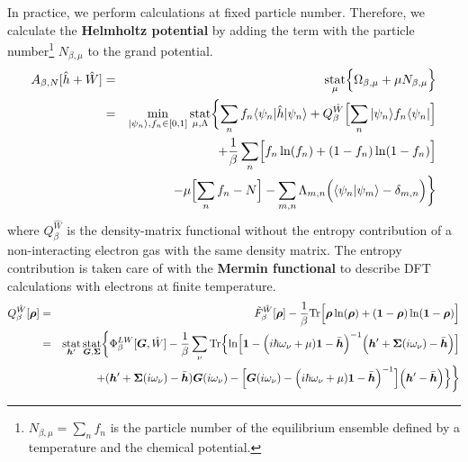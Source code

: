 \documentclass[11pt,a4paper]{report}
\begin{document}
In practice, we perform calculations at fixed particle
number. Therefore, we calculate the \textbf{Helmholtz
  potential} by adding the term with the
particle number\footnote{$N_{\beta,\mu}=\sum_n f_n$ is the particle
  number of the equilibrium ensemble defined by a temperature and the
  chemical potential.} $N_{\beta,\mu}$ to the grand potential.
\begin{eqnarray}
A_{\beta,N}[\hat{h}+\hat{W}]
&=&\operatorname*{stat}_\mu\Bigl\lbrace\Omega_{\beta,\mu}+\mu N_{\beta,\mu}\Bigr\rbrace
\nonumber\\
&=&\min_{|\psi_n\rangle,f_n\in[0,1]}\operatorname*{stat}_{\mu,\Lambda}
\biggl\lbrace\sum_n f_n\langle\psi_n|\hat{h}|\psi_n\rangle
+Q_\beta^{\hat{W}}\Bigl[\sum_n|\psi_n\rangle f_n\langle\psi_n|\Bigr]
\nonumber\\
&&+\frac{1}{\beta}\sum_n\Bigl[f_n\ln(f_n)+(1-f_n)\ln(1-f_n)\Bigr]
\nonumber\\
&&
-\mu\Bigl[\sum_n f_n-N\Bigr]
-\sum_{m,n}\Lambda_{m,n}\Bigl(\langle\psi_n|\psi_m\rangle-\delta_{m,n}\Bigr)
\biggr\rbrace
\label{eq:hp}
\end{eqnarray}
where $Q^{\hat{W}}_\beta$ is the density-matrix functional without the
entropy contribution of a non-interacting electron gas with the same
density matrix.  The entropy contribution is taken care of with the
\textbf{Mermin functional}\cite{mermin65_pr137_a1441} to describe DFT calculations
with electrons at finite temperature.
\begin{eqnarray}
Q^{\hat{W}}_\beta[\bm{\rho}]
&=&\tilde{F}^{\hat{W}}_\beta[\bm{\rho}]
-
\frac{1}{\beta}\mathrm{Tr}\Bigl[
\bm{\rho}\ln(\bm{\rho})+(\bm{1}-\bm{\rho})\ln(\bm{1}-\bm{\rho})\Bigr]
\nonumber\\
&=&
\operatorname*{stat}_{\bm{h}'}\operatorname*{stat}_{\bm{G},\bm{\Sigma}}
\biggl\lbrace
\Phi^{LW}_\beta[\bm{G},\hat{W}]
-\frac{1}{\beta}\sum_\nu\mathrm{Tr}\Bigl\lbrace
\ln\Bigl[
\bm{1}-
\Bigl(i\hbar\omega_\nu+\mu)\bm{1}-\bar{\bm{h}}\Bigr)^{-1}
\Bigl(\bm{h}'+\bm{\Sigma}(i\omega_\nu)-\bar{\bm{h}}\Bigr)
\Bigr]
\nonumber\\&&
+(\bm{h}'+\bm{\Sigma}(i\omega_\nu)-\bar{\bm{h}})\bm{G}(i\omega_\nu)
-
\Bigl[
\bm{G}(i\omega_\nu)
-\Bigl(i\hbar\omega_\nu+\mu)\bm{1}-\bar{\bm{h}}\Bigr)^{-1}
\Bigr]
\Bigl(\bm{h}'-\bar{\bm{h}}\Bigr)\Bigr\rbrace
\biggr\rbrace
\label{eq:dmfQgreen}
\end{eqnarray}

\end{document}
